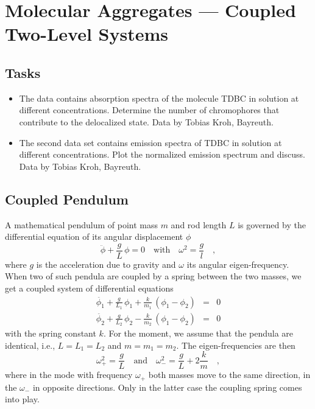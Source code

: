 

\chapter{Molecular Aggregates --- Coupled Two-Level Systems}



\section{Tasks}

\begin{itemize}
\item The data contains absorption spectra of the molecule TDBC in solution at different concentrations. Determine the number of chromophores that contribute to the delocalized state. Data by Tobias Kroh, Bayreuth.

\item The second data set contains emission spectra of TDBC in solution at different concentrations. Plot the normalized emission spectrum and discuss. Data by Tobias Kroh, Bayreuth.
\end{itemize}






\section{Coupled Pendulum}

A mathematical pendulum of point mass $m$ and rod length $L$ is governed by the differential equation of its angular displacement $\phi$
\begin{equation}
 \ddot{\phi} + \frac{g}{L} \, \phi = 0 \quad \text{with} \quad \omega^2 = \frac{g}{l}  \quad , 
\end{equation}
where $g$ is the acceleration due to gravity and $\omega$ its angular eigen-frequency. When two of such pendula are coupled by a spring between the two masses, we get a coupled system of differential equations
\begin{eqnarray}
 \ddot{\phi_1} + \frac{g}{L_1} \, \phi_1  + \frac{k}{m_1} \, \left( \phi_1  - \phi_2 \right)  & = &  0  \\
 \ddot{\phi_2} + \frac{g}{L_2} \, \phi_2  - \frac{k}{m_2} \, \left( \phi_1  - \phi_2 \right)  & = &  0  
\end{eqnarray}
with the spring constant $k$.  For the moment, we assume that the pendula are identical, i.e., $L = L_1 = L_2$ and $m = m_1 =m_2$. The eigen-frequencies are then
\begin{equation}
 \omega_{+}^2 = \frac{g}{L} \quad \text{and} \quad 
  \omega_{-}^2 = \frac{g}{L}  + 2 \frac{k}{m} \quad ,
\end{equation}
where in the mode with frequency $\omega_{+}$ both masses move to the same direction, in the $\omega_{-}$ in opposite directions. Only in the latter case the coupling spring comes into play.

